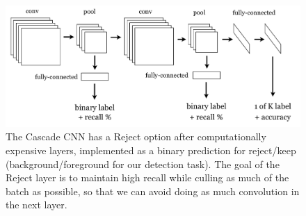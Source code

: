 \begin{figure}[h!]
\begin{center}
\includegraphics[width=0.98\columnwidth]{figures/ccnn-expanded.pdf}
\caption{
The Cascade CNN has a Reject option after computationally expensive layers, implemented as a binary prediction for reject/keep (background/foreground for our detection task).
The goal of the Reject layer is to maintain high recall while culling as much of the batch as possible, so that we can avoid doing as much convolution in the next layer.
}\label{fig:ccnn}
\end{center}
\end{figure}
